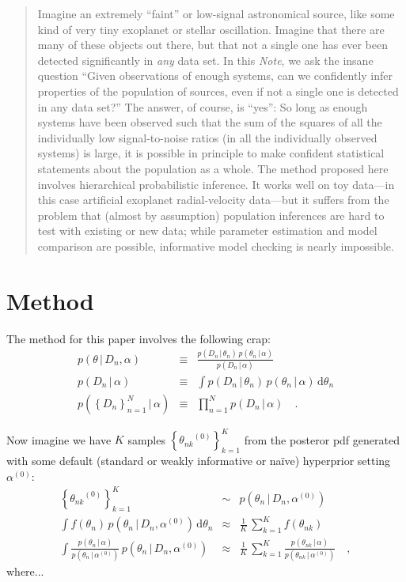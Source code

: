 \documentclass[12pt]{article}
\newcommand{\documentname}{\textsl{Note}}
\newcommand{\given}{\,|\,}
\newcommand{\dd}{\mathrm{d}}
\newcommand{\pdf}{{p}}
\newcommand{\setof}[1]{\left\{{#1}\right\}}
\newcommand{\data}{{D_n}}
\newcommand{\setofalldata}{\setof{\data}_{n=1}^N}
\newcommand{\parsymbol}{\theta}
\newcommand{\pars}{\parsymbol_n}
\newcommand{\hyperpars}{\alpha}
\newcommand{\sample}{\parsymbol_{nk}}
\newcommand{\default}[1]{{#1}^{(0)}}
\newcommand{\setofallsamplesdefault}{\setof{\default{\sample}}_{k=1}^K}
\begin{document}
\begin{abstract}
Imagine an extremely ``faint'' or low-signal astronomical source, like
some kind of very tiny exoplanet or stellar oscillation.  Imagine that
there are many of these objects out there, but that not a single one
has ever been detected significantly in \emph{any} data set.  In this
\documentname, we ask the insane question ``Given observations of
enough systems, can we confidently infer properties of the population
of sources, even if not a single one is detected in any data set?''
The answer, of course, is ``yes'': So long as enough systems have been
observed such that the sum of the squares of all the individually low
signal-to-noise ratios (in all the individually observed systems) is
large, it is possible in principle to make confident statistical
statements about the population as a whole.  The method proposed here
involves hierarchical probabilistic inference.  It works well on toy
data---in this case artificial exoplanet radial-velocity data---but it
suffers from the problem that (almost by assumption) population
inferences are hard to test with existing or new data; while parameter
estimation and model comparison are possible, informative model
checking is nearly impossible.
\end{abstract}

\section{Method}

The method for this paper involves the following crap:
\begin{eqnarray}
\pdf(\theta\given\data,\hyperpars) &\equiv& \frac{\pdf(\data\given\pars)\,\pdf(\pars\given\hyperpars)}{\pdf(\data\given\hyperpars)}
\\
\pdf(\data\given\hyperpars) &\equiv& \int \pdf(\data\given\pars)\,\pdf(\pars\given\hyperpars)\,\dd\pars
\\
\pdf(\setofalldata\given\hyperpars) &\equiv& \prod_{n=1}^N \pdf(\data\given\hyperpars)
\quad.
\end{eqnarray}

Now imagine we have $K$ samples $\setofallsamplesdefault$ from the
posteror pdf generated with some default (standard or weakly
informative or na\"ive) hyperprior setting $\default{\hyperpars}$:
\begin{eqnarray}
\setofallsamplesdefault &\sim& \pdf(\pars\given\data,\default{\hyperpars})
\\
\int f(\pars)\,\pdf(\pars\given\data,\default{\hyperpars})\,\dd\pars &\approx& \frac{1}{K}\,\sum_{k=1}^K f(\sample)
\\
\int \frac{\pdf(\pars\given\hyperpars)}{\pdf(\pars\given\default{\hyperpars})}\,\pdf(\pars\given\data,\default{\hyperpars}) &\approx& \frac{1}{K}\,\sum_{k=1}^K \frac{\pdf(\sample\given\hyperpars)}{\pdf(\sample\given\default{\hyperpars})}
\quad,
\end{eqnarray}
where...
\end{document}
